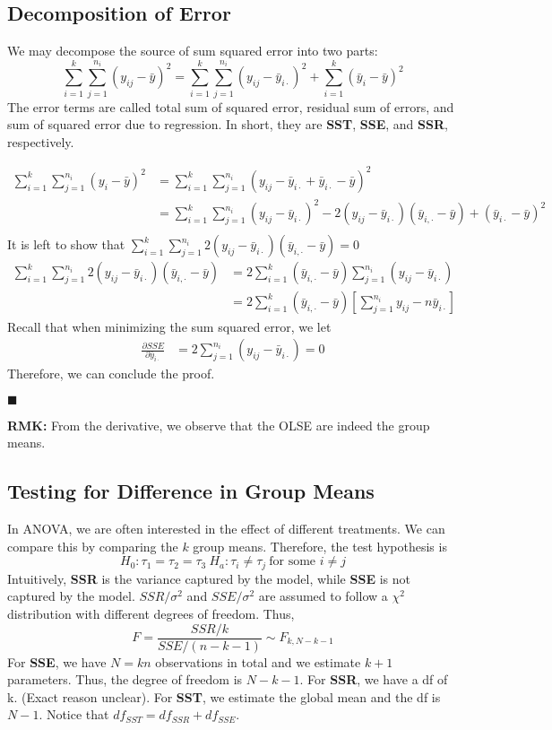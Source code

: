 \documentclass[9pt]{article}
\newcommand{\rmk}{\textbf{RMK: }}
\renewcommand{\qed}{\hfill$\blacksquare$}
\renewenvironment{proof}{\begin{addmargin}[1em]{0em}\begin{newproof}}{\end{newproof}\end{addmargin}\qed}
\begin{document}
\subsection{Decomposition of  Error}
We may decompose the source of sum squared error into two parts:
$$
\sum_{i=1}^{k}\sum_{j=1}^{n_i}(y_{ij} - \bar y)^2 = \sum_{i=1}^{k}\sum_{j=1}^{n_i}(y_{ij} - \bar y_{i\cdot})^2 + \sum^k_{i=1}(\bar y_i - \bar y)^2
$$
The error terms are called total sum of squared error, residual sum of errors, and sum of squared error due to regression. In short, they are \textbf{SST}, \textbf{SSE}, and \textbf{SSR}, respectively.
\begin{proof}
    \begin{align*}
        \sum_{i=1}^{k}\sum_{j=1}^{n_i}(y_i-\bar y)^2 &=  \sum_{i=1}^{k}\sum_{j=1}^{n_i}(y_{ij} - \bar y_{i\cdot} + \bar y_{i\cdot} -\bar y)^2\\
        &= \sum_{i=1}^{k}\sum_{j=1}^{n_i}(y_{ij} - \bar y_{i\cdot})^2 - 2(y_{ij}-\bar y_{i\cdot})(\bar y_{i,\cdot} - \bar y) + (\bar y_{i\cdot} - \bar y)^2\\
    \end{align*}
    It is left to show that $\sum_{i=1}^{k}\sum_{j=1}^{n_i}2(y_{ij}-\bar y_{i\cdot})(\bar y_{i,\cdot} - \bar y) = 0$ 
    \begin{align*}
        \sum_{i=1}^{k}\sum_{j=1}^{n_i}2(y_{ij}-\bar y_{i\cdot})(\bar y_{i,\cdot} - \bar y) &= 2\sum_{i=1}^{k}(\bar y_{i,\cdot} - \bar y)\sum_{j=1}^{n_i}(y_{ij}-\bar y_{i\cdot})\\
        &= 2\sum_{i=1}^{k}(\bar y_{i,\cdot} - \bar y)[\sum_{j=1}^{n_i}y_{ij}-n\bar y_{i\cdot}]
    \end{align*}
    Recall that  when minimizing the sum squared error, we let
    \begin{align*}
        \frac{\partial SSE}{\partial \bar y_{i\cdot}} &= 2\sum_{j=1}^{n_i} (y_{ij} - \bar y_{i\cdot}) = 0
    \end{align*}
    Therefore, we can conclude the proof.
\end{proof}

\rmk From the derivative, we observe that the OLSE are indeed the group means.

\subsection{Testing for Difference in Group Means}
In ANOVA, we are often interested in the effect of different treatments. We can compare this by comparing the $k$ group means. Therefore, the test hypothesis is
$$
H_0: \tau_1=\tau_2=\tau_3\ H_a: \tau_i\not=\tau_j\ \text{for some }i\not = j
$$
Intuitively, \textbf{SSR} is the variance captured by the model, while \textbf{SSE} is not captured by the model. $SSR/\sigma^2$ and $SSE/\sigma^2$ are assumed to follow a $\chi^2$ distribution with different degrees of freedom. Thus,
$$
F = \frac{SSR/k}{SSE/(n-k-1)} \sim F_{k, N-k-1}
$$
For \textbf{SSE}, we have $N=kn$ observations in total and we estimate $k+1$ parameters. Thus, the degree of freedom is $N-k-1$. For \textbf{SSR}, we have a df of k. (Exact reason unclear). For \textbf{SST}, we estimate the global mean and the df is $N - 1$. Notice that $df_{SST} = df_{SSR} + df_{SSE}$.\par
\end{document}
